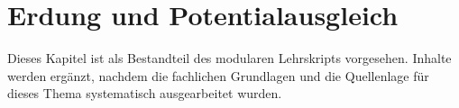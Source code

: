 \chapter{Erdung und Potentialausgleich}
\label{chap:10-erdung-und-potentialausgleich}

Dieses Kapitel ist als Bestandteil des modularen Lehrskripts vorgesehen.
Inhalte werden ergänzt, nachdem die fachlichen Grundlagen und die
Quellenlage für dieses Thema systematisch ausgearbeitet wurden.
